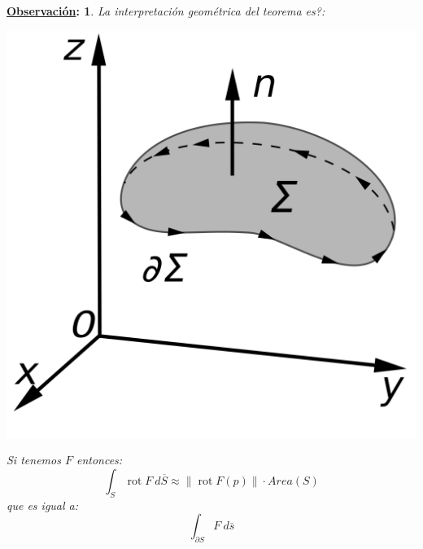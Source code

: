 \documentclass[10pt,a4paper,openright]{book}
\theoremstyle{break}
\newtheorem*{obs}{\underline{Observación}:}
\DeclareMathOperator{\rot}{rot}
\newcommand{\dif}[1]{\ d#1}
\begin{document}
\begin{obs}
La interpretación geométrica del teorema es?: 
\begin{center}
    \includegraphics[scale=0.1]{images/stokeTh} 
\end{center}

Si tenemos $F$ entonces: 
$$\int_{S} \rot F \dif{\overline{S}} \approx \lVert \rot F \left( p \right) \rVert \cdot Area\left( S \right)$$
que es igual a: 
$$\int_{\partial S} F \dif{\overline{s}} $$
\end{obs}
\end{document}
